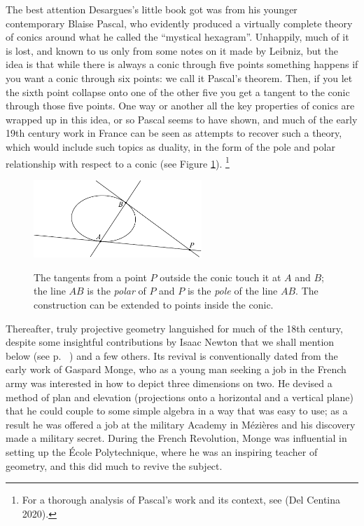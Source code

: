 The best attention Desargues's little book got was from his younger
contemporary Blaise Pascal,
%
 who evidently produced a virtually
complete theory of conics
%
around what he called the ``mystical hexagram''.
%
 Unhappily, much of it is lost, and known to us only from
some notes on it made by Leibniz,
%
but the idea is that while there is
always a conic through five points something happens if you want a conic
through six points: we call it Pascal's theorem.
%
 Then, if you let the
sixth point collapse onto one of the other five you get a tangent to the
conic through those five points. One way or another all the key properties
of conics are wrapped up in this idea, or so Pascal seems to have shown,
and much of the early 19th century work in France can be seen as attempts
to recover such a theory, which would include such topics as duality,
%
in the form of the pole and polar
%
%
relationship with respect to a conic
(see Figure \ref{figpolepolar}).%
%
\footnote{For a thorough analysis of
%
Pascal's work and its context, see (Del Centina 2020).}

\begin{figure}
\includegraphics[width=180pt]{main/poleandpolar}
\caption{The tangents from a point $P$ outside the conic touch it at
  $A$ and $B$; the line $AB$ is the \emph{polar} of $P$ and $P$ is the
  \emph{pole} of the line $AB$. The construction can be extended to
  points inside the conic.}
%
%
      \label{figpolepolar}
\end{figure}

Thereafter, truly projective geometry
%
languished for much of the 18th
century, despite some insightful contributions by Isaac Newton that we
shall mention below (see p. ~\pageref{Newtonconics}) and a few others. Its
revival is conventionally dated from the early work of Gaspard Monge,
%
who as a young man seeking a job in the French army was  interested in
how to depict three dimensions on two. He devised a method of plan and
elevation
%
(projections onto a horizontal and a vertical plane) that he
could couple to some simple algebra in a way that was easy to use; as a
result he was offered a job at the military Academy in M\'ezi\`eres
%
and
his discovery made a military secret. During the French Revolution, Monge
was influential in setting up the \'Ecole Polytechnique,
%
 where he was
an inspiring teacher of geometry, and this did much to revive the subject.

